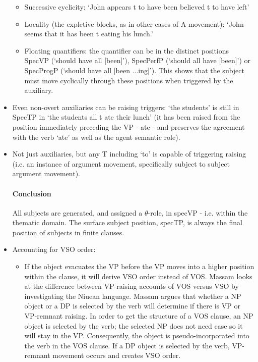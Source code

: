 \documentclass{article}
\begin{document}
\begin{itemize}
\begin{itemize}
    \item Successive cyclicity: `John appears t to have been believed t to have left'
    \item Locality (the expletive blocks, as in other cases of A-movement): `John seems that it has been t eating his lunch.'
    \item Floating quantifiers: the quantifier can be in the distinct positions SpecVP (`should have all [been]'), SpecPerfP (`should all have [been]') or SpecProgP (`should have all [been ...ing]'). This shows that the subject must move cyclically through these positions when triggered by the auxiliary.
\end{itemize}
\item Even non-overt auxiliaries can be raising triggers: `the students' is still in SpecTP in `the students all t ate their lunch' (it has been raised from the position immediately preceding the VP - ate - and preserves the agreement with the verb `ate' as well as the agent semantic role).
\item Not just auxiliaries, but any T including `to' is capable of triggering raising (i.e. an instance of argument movement, specifically subject to subject argument movement).
\paragraph{Conclusion} All subjects are generated, and assigned a $\theta$-role, in specVP - i.e. within the thematic domain. The surface subject position, specTP, is always the final position of subjects in finite clauses.
\item Accounting for VSO order:
\begin{itemize}
    \item If the object evacuates the VP before the VP moves into a higher position within the clause, it will derive VSO order instead of VOS. Massam looks at the difference between VP-raising accounts of VOS versus VSO by investigating the Niuean language. Massam argues that whether a NP object or a DP is selected by the verb will determine if there is VP or VP-remnant raising. In order to get the structure of a VOS clause, an NP object is selected by the verb; the selected NP does not need case so it will stay in the VP. Consequently, the object is pseudo-incorporated into the verb in the VOS clause. If a DP object is selected by the verb, VP-remnant movement occurs and creates VSO order.
\end{itemize}

\end{itemize}
\end{document}
